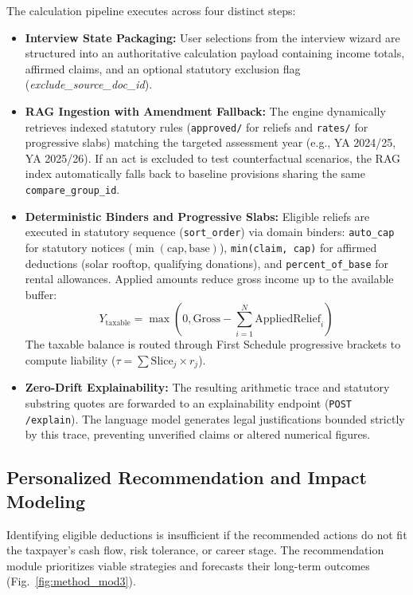 \documentclass[conference]{IEEEtran}
\begin{document}
The calculation pipeline executes across four distinct steps:
\begin{itemize}
    \item \textbf{Interview State Packaging:} User selections from the interview wizard are structured into an authoritative calculation payload containing income totals, affirmed claims, and an optional statutory exclusion flag (\textit{exclude\_source\_doc\_id}).
    \item \textbf{RAG Ingestion with Amendment Fallback:} The engine dynamically retrieves indexed statutory rules (\texttt{approved/} for reliefs and \texttt{rates/} for progressive slabs) matching the targeted assessment year (e.g., YA 2024/25, YA 2025/26). If an act is excluded to test counterfactual scenarios, the RAG index automatically falls back to baseline provisions sharing the same \texttt{compare\_group\_id}.
    \item \textbf{Deterministic Binders and Progressive Slabs:} Eligible reliefs are executed in statutory sequence (\texttt{sort\_order}) via domain binders: \texttt{auto\_cap} for statutory notices ($\min(\text{cap}, \text{base})$), \texttt{min(claim, cap)} for affirmed deductions (solar rooftop, qualifying donations), and \texttt{percent\_of\_base} for rental allowances. Applied amounts reduce gross income up to the available buffer:
    \begin{equation}
    Y_{\text{taxable}} = \max\left(0, \text{Gross} - \sum_{i=1}^{N} \text{AppliedRelief}_i\right)
    \end{equation}
    The taxable balance is routed through First Schedule progressive brackets to compute liability ($\tau = \sum \text{Slice}_j \times r_j$).
    \item \textbf{Zero-Drift Explainability:} The resulting arithmetic trace and statutory substring quotes are forwarded to an explainability endpoint (\texttt{POST /explain}). The language model generates legal justifications bounded strictly by this trace, preventing unverified claims or altered numerical figures.
\end{itemize}

\subsection{Personalized Recommendation and Impact Modeling}
Identifying eligible deductions is insufficient if the recommended actions do not fit the taxpayer's cash flow, risk tolerance, or career stage. The recommendation module prioritizes viable strategies and forecasts their long-term outcomes (Fig.~\ref{fig:method_mod3}).
\end{document}
